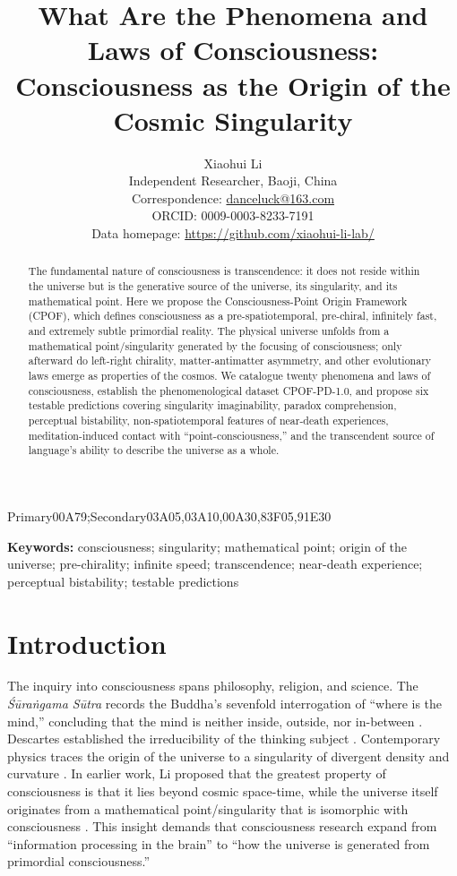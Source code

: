 \documentclass[11pt,a4paper]{article}
\title{\textbf{What Are the Phenomena and Laws of Consciousness:} \\ \textbf{Consciousness as the Origin of the Cosmic Singularity}}
\author{Xiaohui Li\\
Independent Researcher, Baoji, China\\
Correspondence: \href{mailto:danceluck@163.com}{danceluck@163.com}\\
ORCID: 0009-0003-8233-7191\\
Data homepage: \url{https://github.com/xiaohui-li-lab/}}
\date{}
\begin{document}
\maketitle

\begin{abstract}
The fundamental nature of consciousness is transcendence: it does not reside within the universe but is the generative source of the universe, its singularity, and its mathematical point. Here we propose the Consciousness-Point Origin Framework (CPOF), which defines consciousness as a pre-spatiotemporal, pre-chiral, infinitely fast, and extremely subtle primordial reality. The physical universe unfolds from a mathematical point/singularity generated by the focusing of consciousness; only afterward do left-right chirality, matter-antimatter asymmetry, and other evolutionary laws emerge as properties of the cosmos. We catalogue twenty phenomena and laws of consciousness, establish the phenomenological dataset CPOF-PD-1.0, and propose six testable predictions covering singularity imaginability, paradox comprehension, perceptual bistability, non-spatiotemporal features of near-death experiences, meditation-induced contact with ``point-consciousness,'' and the transcendent source of language's ability to describe the universe as a whole.
\end{abstract}

\subjclass[2020]Primary00A79;Secondary03A05,03A10,00A30,83F05,91E30


\noindent\textbf{Keywords:} consciousness; singularity; mathematical point; origin of the universe; pre-chirality; infinite speed; transcendence; near-death experience; perceptual bistability; testable predictions

\section{Introduction}

The inquiry into consciousness spans philosophy, religion, and science. The \textit{Śūraṅgama Sūtra} records the Buddha's sevenfold interrogation of ``where is the mind,'' concluding that the mind is neither inside, outside, nor in-between \cite{surangama}. Descartes established the irreducibility of the thinking subject \cite{descartes1641}. Contemporary physics traces the origin of the universe to a singularity of divergent density and curvature \cite{hawking1973}. In earlier work, Li proposed that the greatest property of consciousness is that it lies beyond cosmic space-time, while the universe itself originates from a mathematical point/singularity that is isomorphic with consciousness \cite{lix2026point,lix2026language}. This insight demands that consciousness research expand from ``information processing in the brain'' to ``how the universe is generated from primordial consciousness.''
\end{document}
